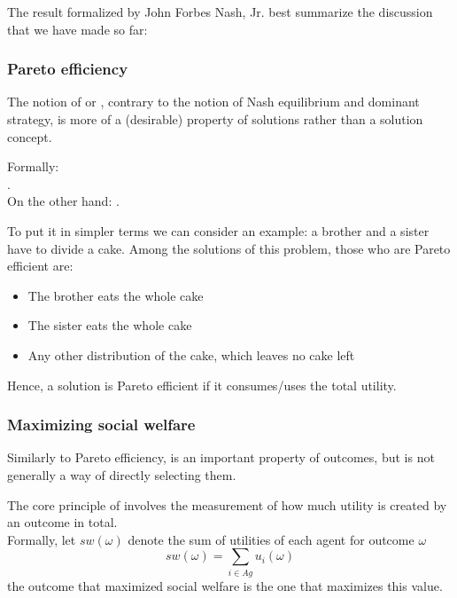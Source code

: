 		The result formalized by John Forbes Nash, Jr. best summarize the discussion that we have made so far:\\
		
\subsubsection{Pareto efficiency}
The notion of  or , contrary to the notion of Nash equilibrium and dominant strategy, is more of a (desirable) property of solutions rather than a solution concept.
		
		Formally:\\
		.\cite{mastxt}\\
		On the other hand:
		\cite{mastxt}.
		
		To put it in simpler terms we can consider an example: a brother and a sister have to divide a cake. Among the solutions of this problem, those who are Pareto efficient are:
		\begin{itemize}
		\item The brother eats the whole cake
		\item The sister eats the whole cake
		\item Any other distribution of the cake, which leaves no cake left
		\end{itemize}
		Hence, a solution is Pareto efficient if it consumes/uses the total utility.
		
\subsubsection{Maximizing social welfare}
Similarly to Pareto efficiency,  is an important property of outcomes, but is not generally a way of directly selecting them.
		
		The core principle of  involves the measurement of how much utility is created by an outcome in total.\\
		Formally, let $sw(\omega)$ denote the sum of utilities of each agent for outcome $\omega$
		\[sw(\omega) =\sum_{i\in Ag} u_i(\omega)\]
		the outcome that maximized social welfare is the one that maximizes this value.
		
